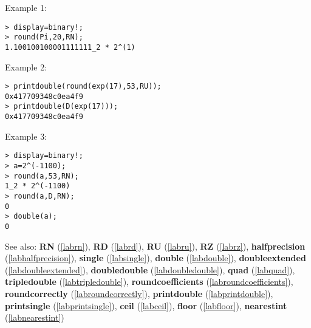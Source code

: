 \noindent Example 1: 
\begin{center}\begin{minipage}{15cm}\begin{Verbatim}[frame=single]
> display=binary!;
> round(Pi,20,RN);
1.100100100001111111_2 * 2^(1)
\end{Verbatim}
\end{minipage}\end{center}
\noindent Example 2: 
\begin{center}\begin{minipage}{15cm}\begin{Verbatim}[frame=single]
> printdouble(round(exp(17),53,RU));
0x417709348c0ea4f9
> printdouble(D(exp(17)));
0x417709348c0ea4f9
\end{Verbatim}
\end{minipage}\end{center}
\noindent Example 3: 
\begin{center}\begin{minipage}{15cm}\begin{Verbatim}[frame=single]
> display=binary!;
> a=2^(-1100);
> round(a,53,RN);
1_2 * 2^(-1100)
> round(a,D,RN);
0
> double(a);
0
\end{Verbatim}
\end{minipage}\end{center}
See also: \textbf{RN} (\ref{labrn}), \textbf{RD} (\ref{labrd}), \textbf{RU} (\ref{labru}), \textbf{RZ} (\ref{labrz}), \textbf{halfprecision} (\ref{labhalfprecision}), \textbf{single} (\ref{labsingle}), \textbf{double} (\ref{labdouble}), \textbf{doubleextended} (\ref{labdoubleextended}), \textbf{doubledouble} (\ref{labdoubledouble}), \textbf{quad} (\ref{labquad}), \textbf{tripledouble} (\ref{labtripledouble}), \textbf{roundcoefficients} (\ref{labroundcoefficients}), \textbf{roundcorrectly} (\ref{labroundcorrectly}), \textbf{printdouble} (\ref{labprintdouble}), \textbf{printsingle} (\ref{labprintsingle}), \textbf{ceil} (\ref{labceil}), \textbf{floor} (\ref{labfloor}), \textbf{nearestint} (\ref{labnearestint})
